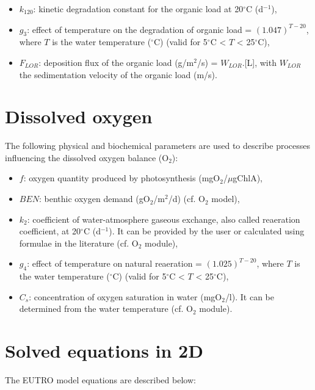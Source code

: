 \begin{itemize}
\item $k_{120}$: kinetic degradation constant for the organic load at 20$^{\circ}$C (d$^{-1}$),
\item $g_3$: effect of temperature on the degradation of organic load = $(1.047)^{T-20}$,
  where $T$ is the water temperature ($^{\circ}$C) (valid for 5$^{\circ}$C < $T$ < 25$^{\circ}$C),
\item $F_{LOR}$: deposition flux of the organic load (g/m$^2$/s) = $W_{LOR}$.[L],
  with $W_{LOR}$ the sedimentation velocity of the organic load (m/s).
\end{itemize}

\section{Dissolved oxygen}

The following physical and biochemical parameters are used to describe processes
influencing the dissolved oxygen balance (O$_2$):

\begin{itemize}
\item $f$: oxygen quantity produced by photosynthesis (mgO$_2$/$\mu$gChlA),
\item $BEN$: benthic oxygen demand (gO$_2$/m$^2$/d) (cf. O$_2$ model),
\item $k_2$: coefficient of water-atmosphere gaseous exchange,
  also called reaeration coefficient, at 20$^{\circ}$C (d$^{-1}$).
  It can be provided by the user or calculated using formulae in the literature (cf. O$_2$ module),
\item $g_4$: effect of temperature on natural reaeration = $(1.025)^{T-20}$,
  where $T$ is the water temperature ($^{\circ}$C) (valid for 5$^{\circ}$C < $T$ < 25$^{\circ}$C),
\item $C_s$: concentration of oxygen saturation in water (mgO$_2$/l).
  It can be determined from the water temperature (cf. O$_2$ module).
\end{itemize}

\section{Solved equations in 2D}

The EUTRO model equations are described below:\\

